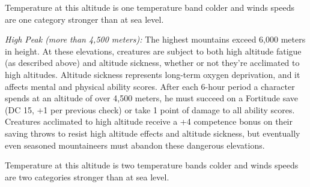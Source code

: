 Temperature at this altitude is one temperature band colder and winds speeds are one category stronger than at sea level.

\textit{High Peak (more than 4,500 meters):} The highest mountains exceed 6,000 meters in height. At these elevations, creatures are subject to both high altitude fatigue (as described above) and altitude sickness, whether or not they're acclimated to high altitudes. Altitude sickness represents long-term oxygen deprivation, and it affects mental and physical ability scores. After each 6-hour period a character spends at an altitude of over 4,500 meters, he must succeed on a Fortitude save (DC 15, +1 per previous check) or take 1 point of damage to all ability scores. Creatures acclimated to high altitude receive a +4 competence bonus on their saving throws to resist high altitude effects and altitude sickness, but eventually even seasoned mountaineers must abandon these dangerous elevations.

Temperature at this altitude is two temperature bands colder and winds speeds are two categories stronger than at sea level.
